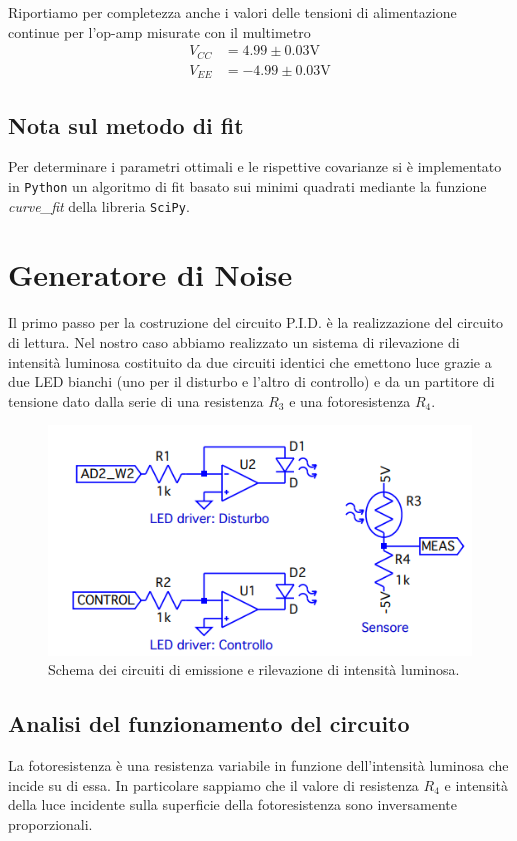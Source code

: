 \documentclass[10pt, a4paper, italian]{article}
\begin{document}
Riportiamo per completezza anche i valori delle tensioni di alimentazione
continue per l'op-amp misurate con il multimetro
\begin{align*}
V_{CC} &= 4.99 \pm 0.03 \si{\V} \\
V_{EE} &= -4.99 \pm 0.03 \si{\V}
\end{align*}

\subsection*{Nota sul metodo di fit}
Per determinare i parametri ottimali e le rispettive covarianze si \`e
implementato in \verb+Python+ un algoritmo di fit basato sui minimi quadrati
mediante la funzione \emph{curve\_fit} della libreria \texttt{SciPy}.

\section{Generatore di Noise}
Il primo passo per la costruzione del circuito P.I.D. è la realizzazione del
circuito di lettura. Nel nostro caso abbiamo realizzato un sistema di
rilevazione di intensità luminosa costituito da due circuiti identici che
emettono luce grazie a due LED bianchi (uno per il disturbo e l'altro di
controllo) e da un partitore di tensione dato dalla serie di una resistenza
$R_3$ e una fotoresistenza $R_4$.

\begin{figure}[htbp]
    \centering
	\includegraphics[scale=0.7]{noisegen}
    \caption{Schema dei circuiti di emissione e rilevazione di intensità
    luminosa.
    \label{schm: mesctrl}}
\end{figure}

\subsection{Analisi del funzionamento del circuito}
La fotoresistenza è una resistenza variabile in funzione dell'intensità
luminosa che incide su di essa. In particolare sappiamo che il valore di
resistenza $R_4$ e intensità della luce incidente sulla superficie della
fotoresistenza sono inversamente proporzionali.
\end{document}
